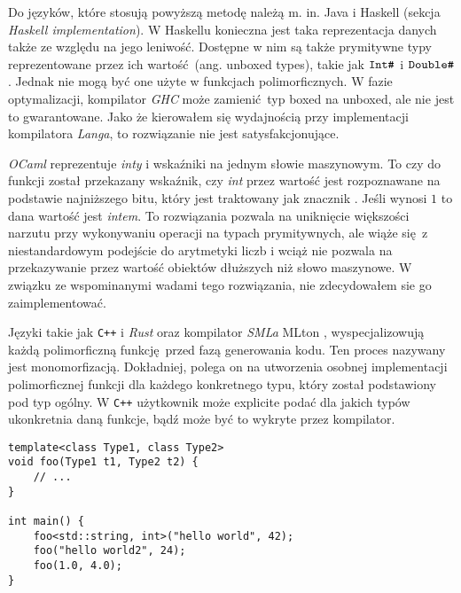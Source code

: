 \documentclass[declaration,shortabstract]{iithesis}
\begin{document}
Do języków, które stosują powyższą metodę należą m. in. Java 
\cite{type_erasure} i Haskell 
\cite{haskell_poly}(sekcja \textit{Haskell implementation}).
W Haskellu konieczna jest taka reprezentacja danych także ze względu na jego 
leniwość. Dostępne w nim są także prymitywne typy reprezentowane przez 
ich wartość (ang. unboxed types), takie jak $\verb!Int#!$ i 
$\verb!Double#!$. Jednak nie mogą być one użyte w funkcjach polimorficznych. 
W fazie optymalizacji, kompilator \textit{GHC} może zamienić typ boxed 
na unboxed, ale nie jest to gwarantowane. Jako że kierowałem się wydajnością
przy implementacji kompilatora \textit{Langa}, to rozwiązanie nie jest 
satysfakcjonujące.

\textit{OCaml} reprezentuje \textit{inty} i wskaźniki na jednym słowie 
maszynowym. To czy do funkcji został przekazany wskaźnik, czy \textit{int}
przez wartość jest rozpoznawane na podstawie najniższego bitu, który jest 
traktowany jak znacznik \cite{ocaml_31bit}. Jeśli wynosi $1$ to dana wartość jest \textit{intem}.
To rozwiązania pozwala na uniknięcie większości narzutu przy wykonywaniu 
operacji na typach prymitywnych, ale wiąże się z niestandardowym podejście do 
arytmetyki liczb i wciąż nie pozwala na przekazywanie przez wartość obiektów 
dłuższych niż słowo maszynowe. W związku ze wspominanymi wadami tego 
rozwiązania, nie zdecydowałem sie go zaimplementować.

Języki takie jak \texttt{C++} i \textit{Rust} oraz kompilator \textit{SMLa} 
MLton \cite{mono_mlton}, wyspecjalizowują każdą polimorficzną funkcję przed 
fazą generowania 
kodu. Ten proces nazywany jest monomorfizacją. Dokładniej, polega on na 
utworzenia osobnej 
implementacji polimorficznej funkcji dla każdego konkretnego typu, który 
został 
podstawiony pod typ ogólny. W \texttt{C++} użytkownik może explicite podać 
dla jakich typów ukonkretnia daną funkcje, bądź może być to wykryte przez 
kompilator.

\begin{lstlisting}[frame=single, caption={Polimorficzna funkcja w 
\texttt{C++} z użyciem szablonów (ang. template)}]
template<class Type1, class Type2>
void foo(Type1 t1, Type2 t2) {
    // ...
}

int main() {
    foo<std::string, int>("hello world", 42);
    foo("hello world2", 24);
    foo(1.0, 4.0);
}
\end{lstlisting}
\end{document}
